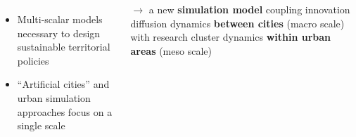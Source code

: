 \documentclass[a0paper]{tikzposter}
\begin{document}
\begin{columns}
{%


           
            
			\begin{itemize}
				\item Multi-scalar models necessary to design sustainable territorial policies \cite{rozenblat2018conclusion}
				\item ``Artificial cities'' \cite{raimbault2020cities} and urban simulation approaches focus on a single scale
			\end{itemize}
			
			$\rightarrow$ a new \textbf{simulation model} coupling innovation diffusion dynamics \textbf{between cities} (macro scale) with research cluster dynamics \textbf{within urban areas} (meso scale)
		
		}
		
	\end{columns}
	
\end{document}
